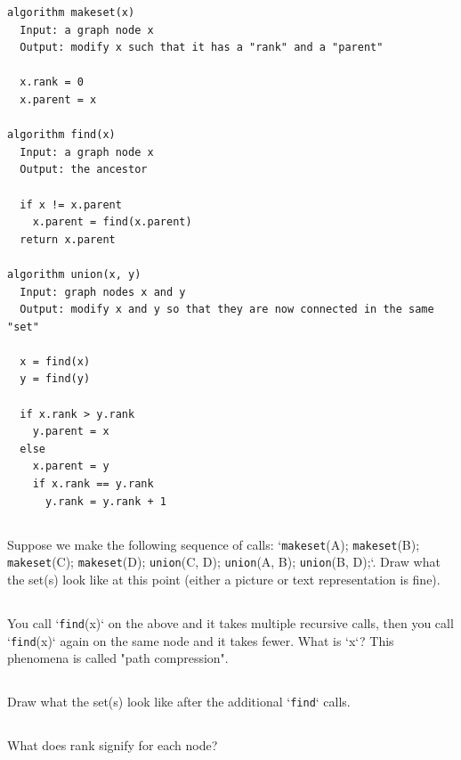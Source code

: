\documentclass [12pt]{article}
\begin{document}
\begin{verbatim}
algorithm makeset(x)
  Input: a graph node x
  Output: modify x such that it has a "rank" and a "parent"

  x.rank = 0
  x.parent = x

algorithm find(x)
  Input: a graph node x
  Output: the ancestor

  if x != x.parent
    x.parent = find(x.parent)
  return x.parent

algorithm union(x, y)
  Input: graph nodes x and y
  Output: modify x and y so that they are now connected in the same "set"

  x = find(x)
  y = find(y)

  if x.rank > y.rank
    y.parent = x
  else
    x.parent = y
    if x.rank == y.rank
      y.rank = y.rank + 1
\end{verbatim}


\subsection{}
Suppose we make the following sequence of calls: `\texttt{makeset}(A); \texttt{makeset}(B); \texttt{makeset}(C); \texttt{makeset}(D); \texttt{union}(C, D); \texttt{union}(A, B); \texttt{union}(B, D);`. Draw what the set(s) look like at this point (either a picture or text representation is fine).


\subsection{}
You call `\texttt{find}(x)` on the above and it takes multiple recursive calls, then you call `\texttt{find}(x)` again on the same node and it takes fewer. What is `x`? This phenomena is called "path compression".


\subsection{}
Draw what the set(s) look like after the additional `\texttt{find}` calls. 


\subsection{}
What does rank signify for each node?
\end{document}

